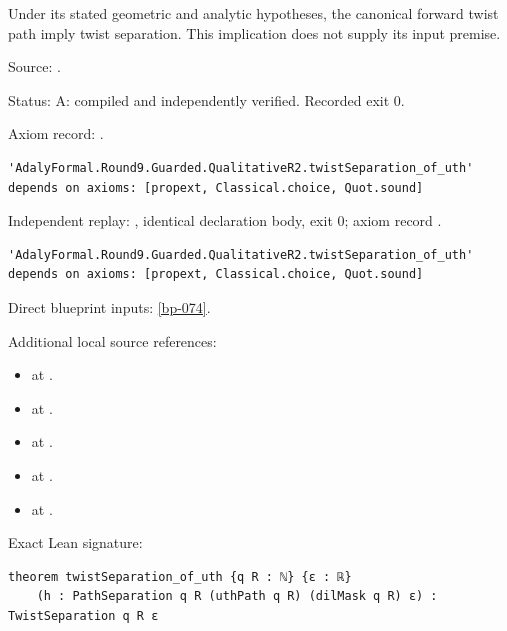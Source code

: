 \begin{theorem}[bp-292]
\label{bp-292}
\leanok
Under its stated geometric and analytic hypotheses, the canonical forward twist path imply twist separation. This implication does not supply its input premise.

\par Source: \texttt{}.
\par Status: A: compiled and independently verified. Recorded exit 0.
\par Axiom record: \texttt{}.
\begin{verbatim}
'AdalyFormal.Round9.Guarded.QualitativeR2.twistSeparation_of_uth' depends on axioms: [propext, Classical.choice, Quot.sound]
\end{verbatim}
\par Independent replay: \texttt{}, identical declaration body, exit 0; axiom record \texttt{}.
\begin{verbatim}
'AdalyFormal.Round9.Guarded.QualitativeR2.twistSeparation_of_uth' depends on axioms: [propext, Classical.choice, Quot.sound]
\end{verbatim}
\par Direct blueprint inputs: \ref{bp-074}.
\par Additional local source references:
\begin{itemize}
\item \texttt{} at \texttt{}.
\item \texttt{} at \texttt{}.
\item \texttt{} at \texttt{}.
\item \texttt{} at \texttt{}.
\item \texttt{} at \texttt{}.
\end{itemize}
\par Exact Lean signature:
\begin{verbatim}
theorem twistSeparation_of_uth {q R : ℕ} {ε : ℝ}
    (h : PathSeparation q R (uthPath q R) (dilMask q R) ε) : TwistSeparation q R ε
\end{verbatim}
\end{theorem}

